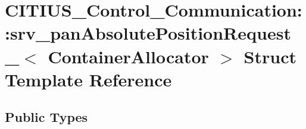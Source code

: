 \hypertarget{struct_c_i_t_i_u_s___control___communication_1_1srv__pan_absolute_position_request__}{\section{\-C\-I\-T\-I\-U\-S\-\_\-\-Control\-\_\-\-Communication\-:\-:srv\-\_\-pan\-Absolute\-Position\-Request\-\_\-$<$ \-Container\-Allocator $>$ \-Struct \-Template \-Reference}
\label{struct_c_i_t_i_u_s___control___communication_1_1srv__pan_absolute_position_request__}
}
\subsection*{\-Public \-Types}

